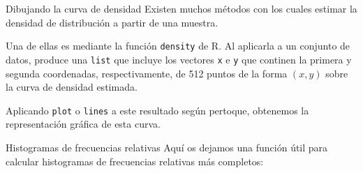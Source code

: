 \documentclass[
  ignorenonframetext,
]{beamer}
\newenvironment{Shaded}{\begin{snugshade}}{\end{snugshade}}
\newcommand{\CharTok}[1]{\textcolor[rgb]{0.31,0.60,0.02}{#1}}
\newcommand{\ControlFlowTok}[1]{\textcolor[rgb]{0.13,0.29,0.53}{\textbf{#1}}}
\newcommand{\DataTypeTok}[1]{\textcolor[rgb]{0.13,0.29,0.53}{#1}}
\newcommand{\DecValTok}[1]{\textcolor[rgb]{0.00,0.00,0.81}{#1}}
\newcommand{\FloatTok}[1]{\textcolor[rgb]{0.00,0.00,0.81}{#1}}
\newcommand{\KeywordTok}[1]{\textcolor[rgb]{0.13,0.29,0.53}{\textbf{#1}}}
\newcommand{\NormalTok}[1]{#1}
\newcommand{\OperatorTok}[1]{\textcolor[rgb]{0.81,0.36,0.00}{\textbf{#1}}}
\newcommand{\OtherTok}[1]{\textcolor[rgb]{0.56,0.35,0.01}{#1}}
\newcommand{\StringTok}[1]{\textcolor[rgb]{0.31,0.60,0.02}{#1}}
\begin{document}
\begin{frame}[fragile]{Dibujando la curva de densidad}
\protect\hypertarget{dibujando-la-curva-de-densidad}{}
Existen muchos métodos con los cuales estimar la densidad de
distribución a partir de una muestra.

Una de ellas es mediante la función \texttt{density} de R. Al aplicarla
a un conjunto de datos, produce una \texttt{list} que incluye los
vectores \texttt{x} e \texttt{y} que continen la primera y segunda
coordenadas, respectivamente, de 512 puntos de la forma \((x,y)\) sobre
la curva de densidad estimada.

Aplicando \texttt{plot} o \texttt{lines} a este resultado según
pertoque, obtenemos la representación gráfica de esta curva.
\end{frame}

\begin{frame}[fragile]{Histogramas de frecuencias relativas}
\protect\hypertarget{histogramas-de-frecuencias-relativas-1}{}
Aquí os dejamos una función útil para calcular histogramas de
frecuencias relativas más completos:

\begin{Shaded}
\end{Shaded}
\end{frame}
\end{document}
